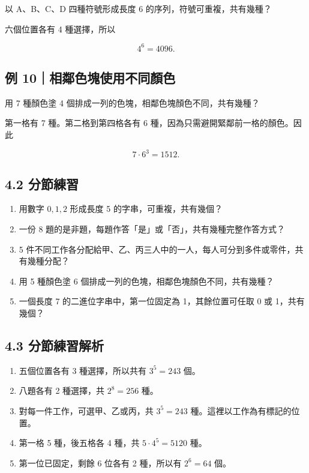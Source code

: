 \documentclass[11pt,a4paper]{article}
\providecommand{\tightlist}{%
  \setlength{\itemsep}{0pt}\setlength{\parskip}{0pt}}
\begin{document}
以 A、B、C、D 四種符號形成長度 6 的序列，符號可重複，共有幾種？

六個位置各有 4 種選擇，所以

\[
4^6=4096.
\]

\subsection{例 10｜相鄰色塊使用不同顏色}\label{ux4f8b-10ux76f8ux9130ux8272ux584aux4f7fux7528ux4e0dux540cux984fux8272}

用 7 種顏色塗 4 個排成一列的色塊，相鄰色塊顏色不同，共有幾種？

第一格有 7 種。第二格到第四格各有 6 種，因為只需避開緊鄰前一格的顏色。因此

\[
7\cdot6^3=1512.
\]

\subsection{4.2 分節練習}\label{ux5206ux7bc0ux7df4ux7fd2-3}

\begin{enumerate}
\def\labelenumi{\arabic{enumi}.}
\tightlist
\item
  用數字 \(0,1,2\) 形成長度 5 的字串，可重複，共有幾個？
\item
  一份 8 題的是非題，每題作答「是」或「否」，共有幾種完整作答方式？
\item
  5 件不同工作各分配給甲、乙、丙三人中的一人，每人可分到多件或零件，共有幾種分配？
\item
  用 5 種顏色塗 6 個排成一列的色塊，相鄰色塊顏色不同，共有幾種？
\item
  一個長度 7 的二進位字串中，第一位固定為 1，其餘位置可任取 0 或 1，共有幾個？
\end{enumerate}

\subsection{4.3 分節練習解析}\label{ux5206ux7bc0ux7df4ux7fd2ux89e3ux6790-3}

\begin{enumerate}
\def\labelenumi{\arabic{enumi}.}
\tightlist
\item
  五個位置各有 3 種選擇，所以共有 \(3^5=243\) 個。
\item
  八題各有 2 種選擇，共 \(2^8=256\) 種。
\item
  對每一件工作，可選甲、乙或丙，共 \(3^5=243\) 種。這裡以工作為有標記的位置。
\item
  第一格 5 種，後五格各 4 種，共 \(5\cdot4^5=5120\) 種。
\item
  第一位已固定，剩餘 6 位各有 2 種，所以有 \(2^6=64\) 個。
\end{enumerate}
\end{document}
